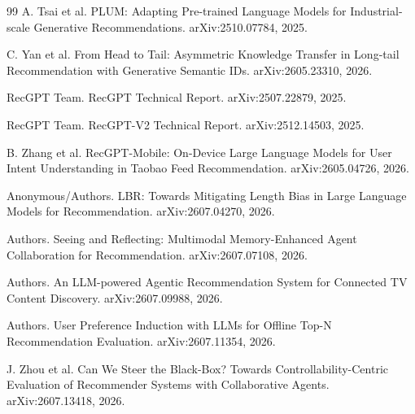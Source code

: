 \documentclass[11pt]{article}
\begin{document}
\begin{thebibliography}{99}
A. Tsai et al.
\newblock PLUM: Adapting Pre-trained Language Models for Industrial-scale Generative Recommendations.
\newblock arXiv:2510.07784, 2025.

C. Yan et al.
\newblock From Head to Tail: Asymmetric Knowledge Transfer in Long-tail Recommendation with Generative Semantic IDs.
\newblock arXiv:2605.23310, 2026.

RecGPT Team.
\newblock RecGPT Technical Report.
\newblock arXiv:2507.22879, 2025.

RecGPT Team.
\newblock RecGPT-V2 Technical Report.
\newblock arXiv:2512.14503, 2025.

B. Zhang et al.
\newblock RecGPT-Mobile: On-Device Large Language Models for User Intent Understanding in Taobao Feed Recommendation.
\newblock arXiv:2605.04726, 2026.

Anonymous/Authors.
\newblock LBR: Towards Mitigating Length Bias in Large Language Models for Recommendation.
\newblock arXiv:2607.04270, 2026.

Authors.
\newblock Seeing and Reflecting: Multimodal Memory-Enhanced Agent Collaboration for Recommendation.
\newblock arXiv:2607.07108, 2026.

Authors.
\newblock An LLM-powered Agentic Recommendation System for Connected TV Content Discovery.
\newblock arXiv:2607.09988, 2026.

Authors.
\newblock User Preference Induction with LLMs for Offline Top-N Recommendation Evaluation.
\newblock arXiv:2607.11354, 2026.

J. Zhou et al.
\newblock Can We Steer the Black-Box? Towards Controllability-Centric Evaluation of Recommender Systems with Collaborative Agents.
\newblock arXiv:2607.13418, 2026.

\end{thebibliography}
\end{document}
